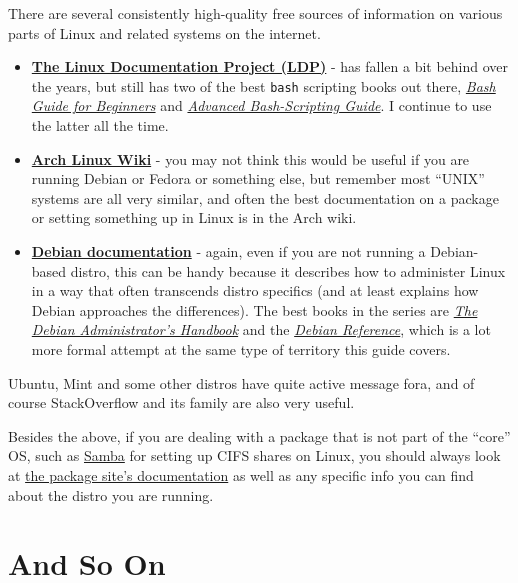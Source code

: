 \documentclass[10pt,]{book}
\numberwithin{figure}{chapter}
\begin{document}
There are several consistently high-quality free sources of information
on various parts of Linux and related systems on the internet.

\begin{itemize}
\item
  \href{http://www.tldp.org/guides.html}{\textbf{The Linux Documentation
  Project (LDP)}} - has fallen a bit behind over the years, but still
  has two of the best \texttt{bash} scripting books out there,
  \href{http://www.tldp.org/LDP/Bash-Beginners-Guide/html/index.html}{\emph{Bash
  Guide for Beginners}} and
  \href{http://www.tldp.org/LDP/abs/html/index.html}{\emph{Advanced
  Bash-Scripting Guide}}. I continue to use the latter all the time.
\item
  \href{https://wiki.archlinux.org/}{\textbf{Arch Linux Wiki}} - you may
  not think this would be useful if you are running Debian or Fedora or
  something else, but remember most ``UNIX'' systems are all very
  similar, and often the best documentation on a package or setting
  something up in Linux is in the Arch wiki.
\item
  \href{https://www.debian.org/doc/}{\textbf{Debian documentation}} -
  again, even if you are not running a Debian-based distro, this can be
  handy because it describes how to administer Linux in a way that often
  transcends distro specifics (and at least explains how Debian
  approaches the differences). The best books in the series are
  \href{https://www.debian.org/doc/manuals/debian-handbook/}{\emph{The
  Debian Administrator's Handbook}} and the
  \href{https://www.debian.org/doc/manuals/debian-reference/}{\emph{Debian
  Reference}}, which is a lot more formal attempt at the same type of
  territory this guide covers.
\end{itemize}

Ubuntu, Mint and some other distros have quite active message fora, and
of course StackOverflow and its family are also very useful.

Besides the above, if you are dealing with a package that is not part of
the ``core'' OS, such as \href{https://www.samba.org/samba/}{Samba} for
setting up CIFS shares on Linux, you should always look at
\href{https://www.samba.org/samba/docs/}{the package site's
documentation} as well as any specific info you can find about the
distro you are running.

\chapter{And So On}\label{and-so-on}
\end{document}
